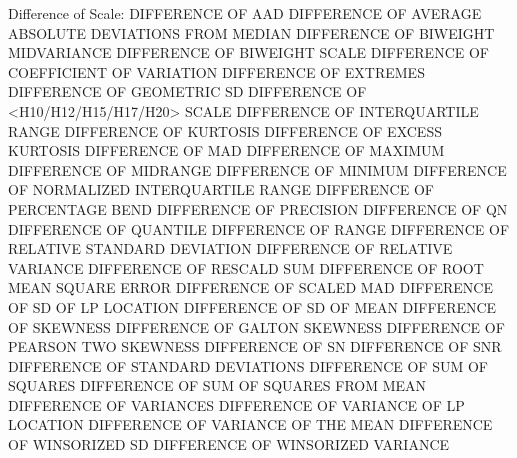 Difference of Scale:
   DIFFERENCE OF AAD
   DIFFERENCE OF AVERAGE ABSOLUTE DEVIATIONS FROM MEDIAN
   DIFFERENCE OF BIWEIGHT MIDVARIANCE
   DIFFERENCE OF BIWEIGHT SCALE
   DIFFERENCE OF COEFFICIENT OF VARIATION
   DIFFERENCE OF EXTREMES
   DIFFERENCE OF GEOMETRIC SD
   DIFFERENCE OF <H10/H12/H15/H17/H20> SCALE
   DIFFERENCE OF INTERQUARTILE RANGE
   DIFFERENCE OF KURTOSIS
   DIFFERENCE OF EXCESS KURTOSIS
   DIFFERENCE OF MAD
   DIFFERENCE OF MAXIMUM
   DIFFERENCE OF MIDRANGE
   DIFFERENCE OF MINIMUM
   DIFFERENCE OF NORMALIZED INTERQUARTILE RANGE
   DIFFERENCE OF PERCENTAGE BEND
   DIFFERENCE OF PRECISION
   DIFFERENCE OF QN
   DIFFERENCE OF QUANTILE
   DIFFERENCE OF RANGE
   DIFFERENCE OF RELATIVE STANDARD DEVIATION
   DIFFERENCE OF RELATIVE VARIANCE
   DIFFERENCE OF RESCALD SUM
   DIFFERENCE OF ROOT MEAN SQUARE ERROR
   DIFFERENCE OF SCALED MAD
   DIFFERENCE OF SD OF LP LOCATION
   DIFFERENCE OF SD OF MEAN
   DIFFERENCE OF SKEWNESS
   DIFFERENCE OF GALTON SKEWNESS
   DIFFERENCE OF PEARSON TWO SKEWNESS
   DIFFERENCE OF SN
   DIFFERENCE OF SNR
   DIFFERENCE OF STANDARD DEVIATIONS
   DIFFERENCE OF SUM OF SQUARES
   DIFFERENCE OF SUM OF SQUARES FROM MEAN
   DIFFERENCE OF VARIANCES
   DIFFERENCE OF VARIANCE OF LP LOCATION
   DIFFERENCE OF VARIANCE OF THE MEAN
   DIFFERENCE OF WINSORIZED SD
   DIFFERENCE OF WINSORIZED VARIANCE

